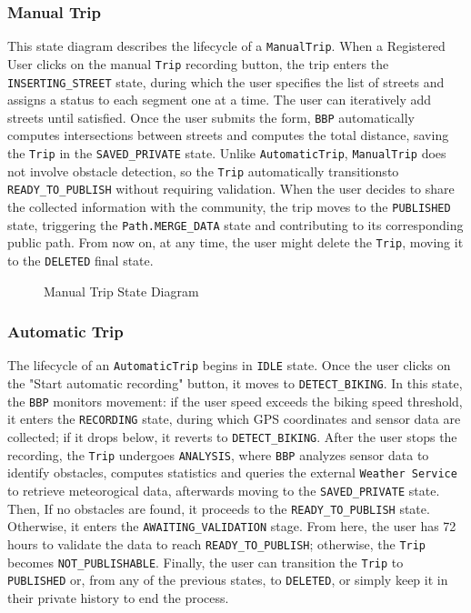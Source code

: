 \subsubsection{Manual Trip}

This state diagram describes the lifecycle of a \texttt{ManualTrip}. When a Registered User clicks on the manual \texttt{Trip} recording button, the trip enters the \texttt{INSERTING\_STREET} state, during which the user specifies the list of streets and assigns a status to each segment one at a time. The user can iteratively add streets until satisfied. Once the user submits the form, \texttt{BBP} automatically computes intersections between streets and computes the total distance, saving the \texttt{Trip} in the \texttt{SAVED\_PRIVATE} state. Unlike \texttt{AutomaticTrip}, \texttt{ManualTrip} does not involve obstacle detection, so the \texttt{Trip} automatically transitionsto \texttt{READY\_TO\_PUBLISH} without requiring validation. When the user decides to share the collected information with the community, the trip moves to the \texttt{PUBLISHED} state, triggering the \texttt{Path.MERGE\_DATA} state and contributing to its corresponding public path. From now on, at any time, the user might delete the \texttt{Trip}, moving it to the \texttt{DELETED} final state.

\begin{figure}[H]
    \centering
    
    \caption{Manual Trip State Diagram}
    \label{fig:manual_trip_state}
\end{figure}

\subsubsection{Automatic Trip}

The lifecycle of an \texttt{AutomaticTrip} begins in \texttt{IDLE} state. Once the user clicks on the "Start automatic recording" button, it moves to \texttt{DETECT\_BIKING}. In this state, the \texttt{BBP} monitors movement: if the user speed exceeds the biking speed threshold, it enters the \texttt{RECORDING} state, during which GPS coordinates and sensor data are collected; if it drops below, it reverts to \texttt{DETECT\_BIKING}. After the user stops the recording, the \texttt{Trip} undergoes \texttt{ANALYSIS}, where \texttt{BBP} analyzes sensor data to identify obstacles, computes statistics and queries the external \texttt{Weather Service} to retrieve meteorogical data, afterwards moving to the \texttt{SAVED\_PRIVATE} state. \\ 
Then, If no obstacles are found, it proceeds to the \texttt{READY\_TO\_PUBLISH} state. Otherwise, it enters the \texttt{AWAITING\_VALIDATION} stage. From here, the user has 72 hours to validate the data to reach \texttt{READY\_TO\_PUBLISH}; otherwise, the \texttt{Trip} becomes \texttt{NOT\_PUBLISHABLE}. Finally, the user can transition the \texttt{Trip} to \texttt{PUBLISHED} or, from any of the previous states, to \texttt{DELETED}, or simply keep it in their private history to end the process.

